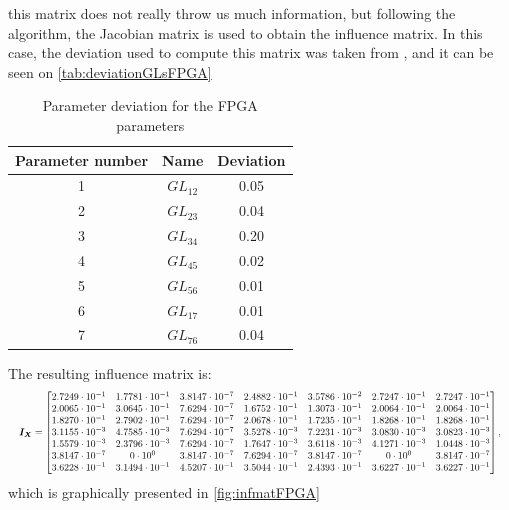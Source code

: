 this matrix does not really throw us much information, but following the algorithm, the  Jacobian matrix is used to obtain the influence matrix. In this case, the deviation used to compute this matrix was taken from \cite{amd2024}, and it can be seen on \autoref{tab:deviationGLsFPGA}
\begin{table}[H]
    \centering
    \caption{Parameter deviation for the FPGA parameters}
    \label{tab:deviationGLsFPGA}
    \begin{tabular}{c c c}
    \toprule
    \multicolumn{1}{c}{\textbf{Parameter number}} & \multicolumn{1}{c}{\textbf{Name}} & \multicolumn{1}{c}{\textbf{Deviation}} \\ \midrule
    1 & $GL_{12}$ & 0.05 \\
    2 & $GL_{23}$ & 0.04 \\
    3 & $GL_{34}$ & 0.20 \\
    4 & $GL_{45}$ & 0.02 \\
    5 & $GL_{56}$ & 0.01 \\
    6 & $GL_{17}$ & 0.01 \\
    7 & $GL_{76}$ & 0.04 \\ \bottomrule  
    \end{tabular}
    \end{table}
    The resulting influence matrix is:
    \begin{equation}
        \resizebox{\textwidth}{!}{$\displaystyle
        \boldsymbol{I_{X}} = \begin{bmatrix}
            2.7249 \cdot 10^{-1} & 1.7781 \cdot 10^{-1} & 3.8147 \cdot 10^{-7} & 2.4882 \cdot 10^{-1} & 3.5786 \cdot 10^{-2} & 2.7247 \cdot 10^{-1} & 2.7247 \cdot 10^{-1} \\
            2.0065 \cdot 10^{-1} & 3.0645 \cdot 10^{-1} & 7.6294 \cdot 10^{-7} & 1.6752 \cdot 10^{-1} & 1.3073 \cdot 10^{-1} & 2.0064 \cdot 10^{-1} & 2.0064 \cdot 10^{-1} \\
            1.8270 \cdot 10^{-1} & 2.7902 \cdot 10^{-1} & 7.6294 \cdot 10^{-7} & 2.0678 \cdot 10^{-1} & 1.7235 \cdot 10^{-1} & 1.8268 \cdot 10^{-1} & 1.8268 \cdot 10^{-1} \\
            3.1155 \cdot 10^{-3} & 4.7585 \cdot 10^{-3} & 7.6294 \cdot 10^{-7} & 3.5278 \cdot 10^{-3} & 7.2231 \cdot 10^{-3} & 3.0830 \cdot 10^{-3} & 3.0823 \cdot 10^{-3} \\
            1.5579 \cdot 10^{-3} & 2.3796 \cdot 10^{-3} & 7.6294 \cdot 10^{-7} & 1.7647 \cdot 10^{-3} & 3.6118 \cdot 10^{-3} & 4.1271 \cdot 10^{-3} & 1.0448 \cdot 10^{-3} \\
            3.8147 \cdot 10^{-7} & 0 \cdot 10^{0} & 3.8147 \cdot 10^{-7} & 7.6294 \cdot 10^{-7} & 3.8147 \cdot 10^{-7} & 0 \cdot 10^{0} & 3.8147 \cdot 10^{-7} \\
            3.6228 \cdot 10^{-1} & 3.1494 \cdot 10^{-1} & 4.5207 \cdot 10^{-1} & 3.5044 \cdot 10^{-1} & 2.4393 \cdot 10^{-1} & 3.6227 \cdot 10^{-1} & 3.6227 \cdot 10^{-1}
            \end{bmatrix},
            $}
        \label{eq:infmatFPGA}
    \end{equation}
     which is graphically presented in \autoref{fig:infmatFPGA}
     
